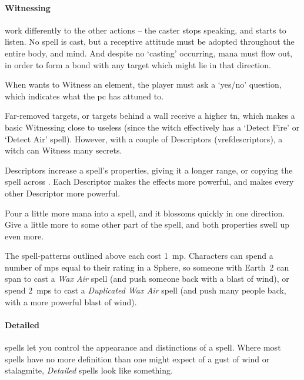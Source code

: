 \begin{multicols}{2}
\paragraph{Witnessing}
work differently to the other actions -- the caster stops speaking, and starts to listen.
No spell is cast, but a receptive attitude must be adopted throughout the entire body, and mind.
And despite no `casting' occurring, mana must flow out, in order to form a bond with any target which might lie in that direction.

When  wants to Witness an element, the player must ask a `yes/no' question, which indicates what the \gls{pc} has attuned to.

Far-removed targets, or targets behind a wall receive a higher \gls{tn}, which makes a basic Witnessing close to useless (since the witch effectively has a `Detect Fire' or `Detect Air' spell).
However, with a couple of Descriptors (vref{descriptors}), a witch can Witness many secrets.

\label{spellDescriptors}

Descriptors increase a spell's properties, giving it a longer range, or copying the spell across .
Each Descriptor makes the effects more powerful, and makes every other Descriptor more powerful.

Pour a little more mana into a spell, and it blossoms quickly in one direction.
Give a little more to some other part of the spell, and both properties swell up even more.

The spell-patterns outlined above each cost 1~\gls{mp}.
Characters can spend a number of \glspl{mp} equal to their rating in a Sphere, so someone with Earth~2 can span  to cast a \textit{Wax Air} spell (and push someone back with a blast of wind), or spend 2~\glspl{mp} to cast a \textit{Duplicated Wax Air} spell (and push many people back, with a more powerful blast of wind).

\paragraph{Detailed}
spells let you control the appearance and distinctions of a spell.
Where most spells have no more definition than one might expect of a gust of wind or stalagmite, \textit{Detailed} spells look like something.


\end{multicols}
